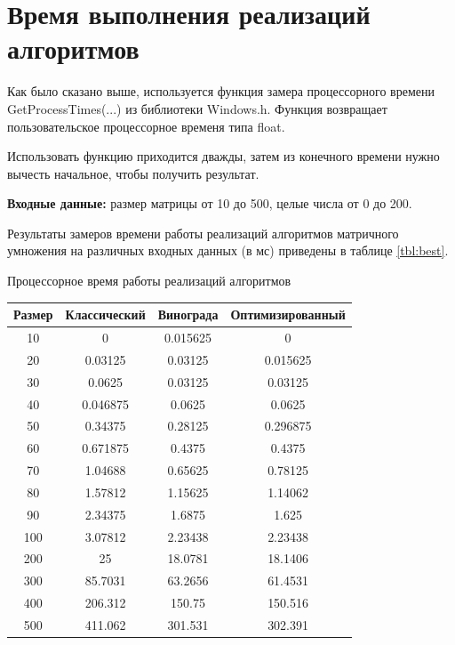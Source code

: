 \section{Время выполнения реализаций алгоритмов}

Как было сказано выше, используется функция замера процессорного времени GetProcessTimes(...) из библиотеки Windows.h. Функция возвращает пользовательское процессорное временя типа float.

Использовать функцию приходится дважды, затем из конечного времени нужно вычесть начальное, чтобы получить результат.

\textbf{Входные данные:} размер матрицы от 10 до 500, целые числа от 0 до 200.

Результаты замеров времени работы реализаций алгоритмов матричного умножения на различных входных данных (в мс) приведены в таблице \ref{tbl:best}.


\begin{center}
	\begin{threeparttable}
		\caption{Процессорное время работы реализаций алгоритмов}
		\label{tbl:best}
		\begin{tabular}{|c|c|c|c|}
			\hline
			Размер & Классический &  Винограда &  Оптимизированный\\
			\hline
			10 & 0  &  0.015625 &0  \\ 
			\hline
			20 &0.03125  &      0.03125 &      0.015625\\ 
			\hline
			30 &  0.0625        &0.03125  &      0.03125 \\ 
			\hline
			40 &  0.046875     &    0.0625 &        0.0625  \\ 
			\hline
			50 & 0.34375      &  0.28125    &   0.296875  \\ 
			\hline
			60 & 0.671875    &     0.4375    &     0.4375 \\ 
			\hline
			70 &  1.04688   &     0.65625     &   0.78125 \\ 
			\hline
			80 & 1.57812   &     1.15625       & 1.14062 \\ 
			\hline
			90 & 2.34375  &       1.6875        &  1.625 \\ 
			\hline
			100 & 3.07812&        2.23438        &2.23438 \\ 
			\hline
			200 & 25 &       18.0781      &  18.1406\\ 
			\hline
			300 &  85.7031    &    63.2656 &       61.4531 \\ 
			\hline
			400 &  206.312   &      150.75  &      150.516  \\ 
			\hline
			500 &  411.062  &      301.531   &     302.391  \\ 
			\hline
		\end{tabular}
		
	\end{threeparttable}
\end{center}

